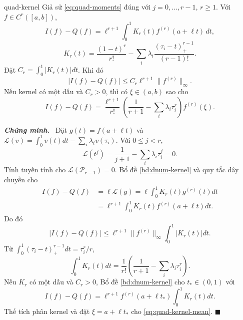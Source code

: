 \documentclass[12pt,a4paper,oneside]{book}
\numberwithin{algorithm}{chapter}
\theoremstyle{definition}
\newenvironment{chungminh}{\par\medskip\noindent\textbf{\textit{\color{mainblue}Chứng minh.}}\ }{\hfill$\blacksquare$\par\medskip}
\begin{document}
\begin{menhde}{}{quad-kernel}
Giả sử \eqref{eq:quad-moments} đúng với $j=0,\ldots,r-1$, $r\geq1$. Với $f\in C^r([a,b])$,
\begin{equation}\label{eq:quad-kernel}
 I(f)-Q(f)=\ell^{r+1}\int_0^1K_r(t)f^{(r)}(a+\ell t)\,dt,
\end{equation}
\[
 K_r(t)=\frac{(1-t)^r}{r!}-\sum_i\lambda_i\frac{(\tau_i-t)_+^{r-1}}{(r-1)!}.
\]
Đặt $C_r=\int_0^1|K_r(t)|dt$. Khi đó
\[
 |I(f)-Q(f)|\leq C_r\ell^{r+1}\lVert f^{(r)}\rVert_\infty.
\]
Nếu kernel có một dấu và $C_r>0$, thì có $\xi\in(a,b)$ sao cho
\begin{equation}\label{eq:quad-kernel-mean}
 I(f)-Q(f)=\frac{\ell^{r+1}}{r!}
 \left(\frac1{r+1}-\sum_i\lambda_i\tau_i^r\right)f^{(r)}(\xi).
\end{equation}
\end{menhde}
\begin{chungminh}
Đặt $g(t)=f(a+\ell t)$ và $\mathcal L(v)=\int_0^1v(t)dt-\sum_i\lambda_iv(\tau_i)$. Với $0\leq j<r$,
\[
 \mathcal L(t^j)=\frac1{j+1}-\sum_i\lambda_i\tau_i^j=0.
\]
Tính tuyến tính cho $\mathcal L(\mathcal P_{r-1})=0$. Bổ đề \ref{bd:dnum-kernel} và quy tắc dây chuyền cho
\begin{align*}
 I(f)-Q(f)&=\ell\mathcal L(g)
 =\ell\int_0^1K_r(t)g^{(r)}(t)dt\\
 &=\ell^{r+1}\int_0^1K_r(t)f^{(r)}(a+\ell t)dt.
\end{align*}
Do đó
\[
 |I(f)-Q(f)|\leq\ell^{r+1}\|f^{(r)}\|_\infty\int_0^1|K_r(t)|dt.
\]
Từ $\int_0^1(\tau_i-t)_+^{r-1}dt=\tau_i^r/r$,
\[
 \int_0^1K_r(t)dt=\frac1{r!}\left(\frac1{r+1}-\sum_i\lambda_i\tau_i^r\right).
\]
Nếu $K_r$ có một dấu và $C_r>0$, Bổ đề \ref{bd:dnum-kernel} cho $t_*\in(0,1)$ với
\[
 I(f)-Q(f)=\ell^{r+1}f^{(r)}(a+\ell t_*)\int_0^1K_r(t)dt.
\]
Thế tích phân kernel và đặt $\xi=a+\ell t_*$ cho \eqref{eq:quad-kernel-mean}.
\end{chungminh}

\end{document}
